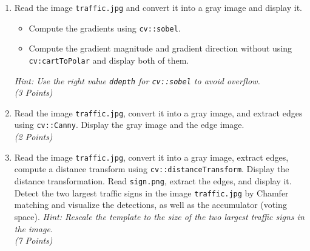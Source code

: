 \documentclass[11pt]{article}
\begin{document}
\begin{enumerate}
	\item	\begin{sloppypar}
		Read the image \texttt{traffic.jpg} and convert it into a gray image and display it.  
		\begin{itemize}
			\item Compute the gradients using \texttt{cv::sobel}.
			\item Compute the gradient magnitude and gradient direction without using \texttt{cv:cartToPolar} and display both of them.
		\end{itemize}
		\emph{Hint: Use the right value \texttt{ddepth} for \texttt{cv::sobel} to avoid overflow.}
		\\ \emph{(3 Points)}
		\end{sloppypar}
	
	\item	Read the image \texttt{traffic.jpg}, convert it into a gray image, and extract edges using \texttt{cv::Canny}. Display the gray image and the edge image.   
		\\ \emph{(2 Points)}
	
	\item	Read the image \texttt{traffic.jpg}, convert it into a gray image, extract edges, compute a distance transform using \texttt{cv::distanceTransform}. Display the distance transformation. Read \texttt{sign.png}, extract the edges, and display it. Detect the two largest traffic signs in the image \texttt{traffic.jpg} by Chamfer matching and visualize the detections, as well as the accumulator (voting space). \emph{Hint: Rescale the template to the size of the two largest traffic signs in the image.}   
		\\ \emph{(7 Points)}
	
	

\end{enumerate}
\end{document}
